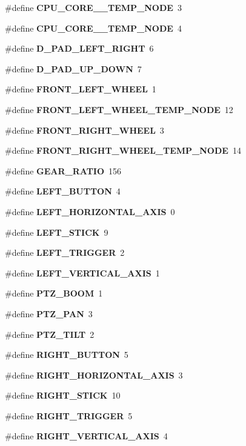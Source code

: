 \begin{DoxyCompactItemize}
\item 
\#define {\bf \-C\-P\-U\-\_\-\-C\-O\-R\-E\-\_\-\_\-\-T\-E\-M\-P\-\_\-\-N\-O\-D\-E}~3
\item 
\#define {\bf \-C\-P\-U\-\_\-\-C\-O\-R\-E\-\_\-\_\-\-T\-E\-M\-P\-\_\-\-N\-O\-D\-E}~4
\item 
\#define {\bf \-D\-\_\-\-P\-A\-D\-\_\-\-L\-E\-F\-T\-\_\-\-R\-I\-G\-H\-T}~6
\item 
\#define {\bf \-D\-\_\-\-P\-A\-D\-\_\-\-U\-P\-\_\-\-D\-O\-W\-N}~7
\item 
\#define {\bf \-F\-R\-O\-N\-T\-\_\-\-L\-E\-F\-T\-\_\-\-W\-H\-E\-E\-L}~1
\item 
\#define {\bf \-F\-R\-O\-N\-T\-\_\-\-L\-E\-F\-T\-\_\-\-W\-H\-E\-E\-L\-\_\-\-T\-E\-M\-P\-\_\-\-N\-O\-D\-E}~12
\item 
\#define {\bf \-F\-R\-O\-N\-T\-\_\-\-R\-I\-G\-H\-T\-\_\-\-W\-H\-E\-E\-L}~3
\item 
\#define {\bf \-F\-R\-O\-N\-T\-\_\-\-R\-I\-G\-H\-T\-\_\-\-W\-H\-E\-E\-L\-\_\-\-T\-E\-M\-P\-\_\-\-N\-O\-D\-E}~14
\item 
\#define {\bf \-G\-E\-A\-R\-\_\-\-R\-A\-T\-I\-O}~156
\item 
\#define {\bf \-L\-E\-F\-T\-\_\-\-B\-U\-T\-T\-O\-N}~4
\item 
\#define {\bf \-L\-E\-F\-T\-\_\-\-H\-O\-R\-I\-Z\-O\-N\-T\-A\-L\-\_\-\-A\-X\-I\-S}~0
\item 
\#define {\bf \-L\-E\-F\-T\-\_\-\-S\-T\-I\-C\-K}~9
\item 
\#define {\bf \-L\-E\-F\-T\-\_\-\-T\-R\-I\-G\-G\-E\-R}~2
\item 
\#define {\bf \-L\-E\-F\-T\-\_\-\-V\-E\-R\-T\-I\-C\-A\-L\-\_\-\-A\-X\-I\-S}~1
\item 
\#define {\bf \-P\-T\-Z\-\_\-\-B\-O\-O\-M}~1
\item 
\#define {\bf \-P\-T\-Z\-\_\-\-P\-A\-N}~3
\item 
\#define {\bf \-P\-T\-Z\-\_\-\-T\-I\-L\-T}~2
\item 
\#define {\bf \-R\-I\-G\-H\-T\-\_\-\-B\-U\-T\-T\-O\-N}~5
\item 
\#define {\bf \-R\-I\-G\-H\-T\-\_\-\-H\-O\-R\-I\-Z\-O\-N\-T\-A\-L\-\_\-\-A\-X\-I\-S}~3
\item 
\#define {\bf \-R\-I\-G\-H\-T\-\_\-\-S\-T\-I\-C\-K}~10
\item 
\#define {\bf \-R\-I\-G\-H\-T\-\_\-\-T\-R\-I\-G\-G\-E\-R}~5
\item 
\#define {\bf \-R\-I\-G\-H\-T\-\_\-\-V\-E\-R\-T\-I\-C\-A\-L\-\_\-\-A\-X\-I\-S}~4
\item 

\end{DoxyCompactItemize}
